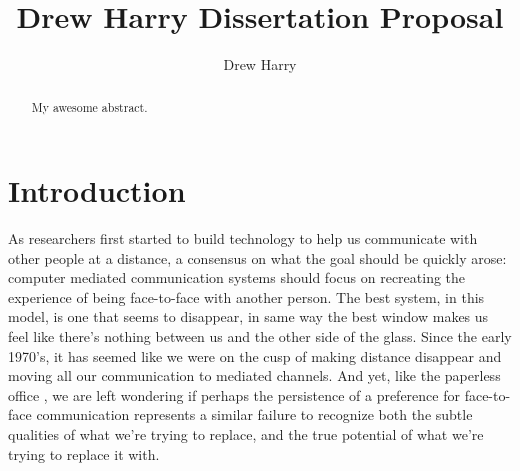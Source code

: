 \documentclass{tufte-handout}
\title{Drew Harry Dissertation Proposal}
\author[Drew Harry]{Drew Harry}
\begin{document}
\maketitle%


\begin{abstract}
\noindent My awesome abstract.
\end{abstract}



\section{Introduction}





As researchers first started to build technology to help us communicate with other people at a distance, a consensus on what the goal should be quickly arose: computer mediated communication systems should focus on recreating the experience of being face-to-face with another person. The best system, in this model, is one that seems to disappear, in same way the best window makes us feel like there's nothing between us and the other side of the glass. Since the early 1970's, it has seemed like we were on the cusp of making distance disappear and moving all our communication to mediated channels. \citep{Egido:1988vq} And yet, like the paperless office \citep{Sellen:2001uk}, we are left wondering if perhaps the persistence of a preference for face-to-face communication represents a similar failure to recognize both the subtle qualities of what we're trying to replace, and the true potential of what we're trying to replace it with. 
\end{document}
